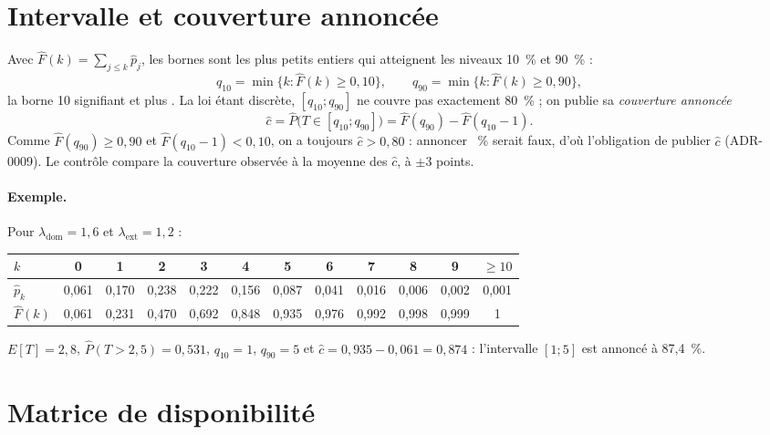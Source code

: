 \section{Intervalle et couverture annoncée}
\label{sec:inference-intervalle}

Avec \(\hat F(k) = \sum_{j \le k} \hat p_j\), les bornes sont les plus petits entiers qui atteignent
les niveaux 10~\% et 90~\% :
\[
  q_{10} = \min\{k : \hat F(k) \ge 0{,}10\},
  \qquad
  q_{90} = \min\{k : \hat F(k) \ge 0{,}90\},
\]
la borne 10 signifiant  et plus \fg{}. La loi étant discrète, \([q_{10} ; q_{90}]\) ne couvre pas
exactement 80~\% ; on publie sa \emph{couverture annoncée}
\[
  \hat c = \hat P\big(T \in [q_{10} ; q_{90}]\big) = \hat F(q_{90}) - \hat F(q_{10} - 1) .
\]
Comme \(\hat F(q_{90}) \ge 0{,}90\) et \(\hat F(q_{10} - 1) < 0{,}10\), on a toujours \(\hat c > 0{,}80\) :
annoncer ~\% \fg{} serait faux, d'où l'obligation de publier \(\hat c\) (ADR-0009). Le contrôle
compare la couverture observée à la moyenne des \(\hat c\), à \(\pm 3\) points.

\paragraph{Exemple.} Pour \(\lambda_{\mathrm{dom}} = 1{,}6\) et \(\lambda_{\mathrm{ext}} = 1{,}2\) :

\begin{center}
\begin{tabular}{lccccccccccc}
\toprule
\(k\) & 0 & 1 & 2 & 3 & 4 & 5 & 6 & 7 & 8 & 9 & \(\ge 10\) \\
\midrule
\(\hat p_k\) & 0,061 & 0,170 & 0,238 & 0,222 & 0,156 & 0,087 & 0,041 & 0,016 & 0,006 & 0,002 & 0,001 \\
\(\hat F(k)\) & 0,061 & 0,231 & 0,470 & 0,692 & 0,848 & 0,935 & 0,976 & 0,992 & 0,998 & 0,999 & 1 \\
\bottomrule
\end{tabular}
\end{center}

\(E[T] = 2{,}8\), \(\hat P(T > 2{,}5) = 0{,}531\), \(q_{10} = 1\), \(q_{90} = 5\) et
\(\hat c = 0{,}935 - 0{,}061 = 0{,}874\) : l'intervalle \([1 ; 5]\) est annoncé à 87,4~\%.

\section{Matrice de disponibilité}
\label{sec:inference-disponibilite}

